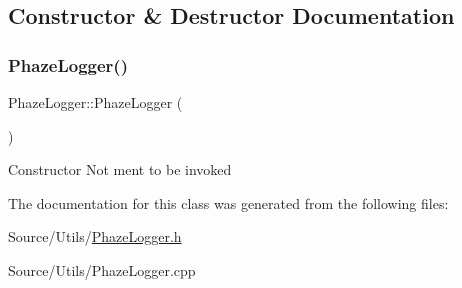 \subsection{Constructor \& Destructor Documentation}
\mbox{\label{class_phaze_logger_ab57f5e5578fdba0eb6bddc4fae30b681}} 
\subsubsection{\texorpdfstring{Phaze\+Logger()}{PhazeLogger()}}
{\footnotesize\ttfamily Phaze\+Logger\+::\+Phaze\+Logger (\begin{DoxyParamCaption}{ }\end{DoxyParamCaption})\hspace{0.3cm}{\ttfamily [delete]}}

Constructor Not ment to be invoked 

The documentation for this class was generated from the following files\+:\begin{DoxyCompactItemize}
\item 
Source/\+Utils/\mbox{\hyperlink{_phaze_logger_8h}{Phaze\+Logger.\+h}}\item 
Source/\+Utils/Phaze\+Logger.\+cpp\end{DoxyCompactItemize}
